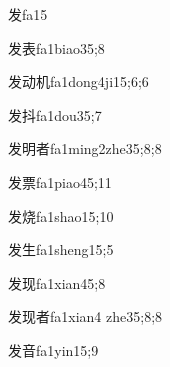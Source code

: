 
\begin{verbete}{发}{fa1}{5}
\end{verbete}

\begin{verbete}{发表}{fa1biao3}{5;8}
\end{verbete}

\begin{verbete}{发动机}{fa1dong4ji1}{5;6;6}
\end{verbete}

\begin{verbete}{发抖}{fa1dou3}{5;7}
\end{verbete}

\begin{verbete}{发明者}{fa1ming2zhe3}{5;8;8}
\end{verbete}

\begin{verbete}{发票}{fa1piao4}{5;11}
\end{verbete}

\begin{verbete}{发烧}{fa1shao1}{5;10}
\end{verbete}

\begin{verbete}{发生}{fa1sheng1}{5;5}
\end{verbete}

\begin{verbete}{发现}{fa1xian4}{5;8}
\end{verbete}

\begin{verbete}{发现者}{fa1xian4 zhe3}{5;8;8}
\end{verbete}

\begin{verbete}{发音}{fa1yin1}{5;9}
\end{verbete}

